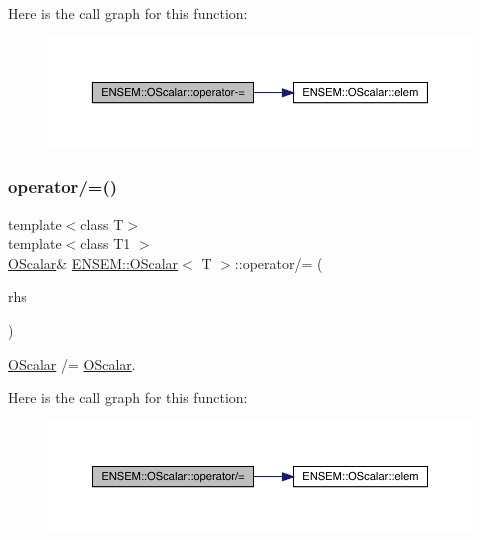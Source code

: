 Here is the call graph for this function\+:
\nopagebreak
\begin{figure}[H]
\begin{center}
\leavevmode
\includegraphics[width=350pt]{da/d80/classENSEM_1_1OScalar_a4d240e95768b5a0c9537b32d00d60ac5_cgraph}
\end{center}
\end{figure}
\mbox{\label{classENSEM_1_1OScalar_a1e0517e29754a8acb284c3ac266c2b2c}} 
\subsubsection{\texorpdfstring{operator/=()}{operator/=()}\hspace{0.1cm}{\footnotesize\ttfamily [1/2]}}
{\footnotesize\ttfamily template$<$class T$>$ \\
template$<$class T1 $>$ \\
\mbox{\hyperlink{classENSEM_1_1OScalar}{O\+Scalar}}\& \mbox{\hyperlink{classENSEM_1_1OScalar}{E\+N\+S\+E\+M\+::\+O\+Scalar}}$<$ T $>$\+::operator/= (\begin{DoxyParamCaption}\item[{const \mbox{\hyperlink{classENSEM_1_1OScalar}{O\+Scalar}}$<$ T1 $>$ \&}]{rhs }\end{DoxyParamCaption})\hspace{0.3cm}{\ttfamily [inline]}}



\mbox{\hyperlink{classENSEM_1_1OScalar}{O\+Scalar}} /= \mbox{\hyperlink{classENSEM_1_1OScalar}{O\+Scalar}}. 

Here is the call graph for this function\+:
\nopagebreak
\begin{figure}[H]
\begin{center}
\leavevmode
\includegraphics[width=350pt]{da/d80/classENSEM_1_1OScalar_a1e0517e29754a8acb284c3ac266c2b2c_cgraph}
\end{center}
\end{figure}
\mbox{\label{classENSEM_1_1OScalar_a1e0517e29754a8acb284c3ac266c2b2c}} 

